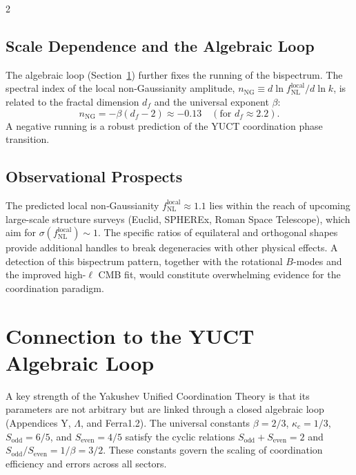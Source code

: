 \documentclass[11pt,a4paper]{article}
\begin{document}
\begin{multicols}{2}
		\subsection{Scale Dependence and the Algebraic Loop}
		The algebraic loop (Section~\ref{sec:algebraic}) further fixes the running of the bispectrum. The spectral index of the local non‑Gaussianity amplitude, \(n_{\mathrm{NG}} \equiv d\ln f_{\mathrm{NL}}^{\mathrm{local}} / d\ln k\), is related to the fractal dimension \(d_f\) and the universal exponent \(\beta\):
		\begin{equation}
			n_{\mathrm{NG}} = -\beta (d_f - 2) \approx -0.13 \quad (\text{for } d_f \approx 2.2).
		\end{equation}
		A negative running is a robust prediction of the YUCT coordination phase transition.
		
		\subsection{Observational Prospects}
		The predicted local non‑Gaussianity \(f_{\mathrm{NL}}^{\mathrm{local}} \approx 1.1\) lies within the reach of upcoming large-scale structure surveys (Euclid, SPHEREx, Roman Space Telescope), which aim for \(\sigma(f_{\mathrm{NL}}^{\mathrm{local}}) \sim 1\). The specific ratios of equilateral and orthogonal shapes provide additional handles to break degeneracies with other physical effects. A detection of this bispectrum pattern, together with the rotational \(B\)-modes and the improved high-\(\ell\) CMB fit, would constitute overwhelming evidence for the coordination paradigm.
		
		\section{Connection to the YUCT Algebraic Loop}
		\label{sec:algebraic}
		
		A key strength of the Yakushev Unified Coordination Theory is that its parameters are not arbitrary but are linked through a closed algebraic loop (Appendices Y, $\Lambda$, and Ferra1.2). The universal constants $\beta=2/3$, $\kappa_c=1/3$, $S_{\mathrm{odd}}=6/5$, and $S_{\mathrm{even}}=4/5$ satisfy the cyclic relations $S_{\mathrm{odd}}+S_{\mathrm{even}}=2$ and $S_{\mathrm{odd}}/S_{\mathrm{even}} = 1/\beta = 3/2$. These constants govern the scaling of coordination efficiency and errors across all sectors.
		

\end{multicols}
\end{document}
